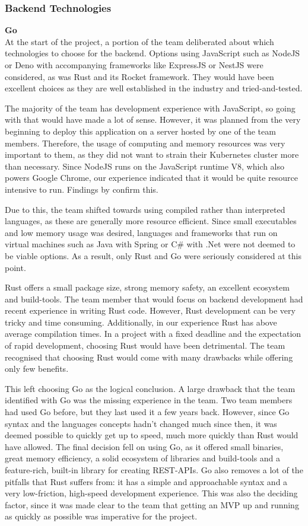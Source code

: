 \subsubsection{Backend Technologies}
\textbf{Go}\\
At the start of the project, a portion of the team deliberated about which
technologies to choose for the backend. Options using JavaScript such as NodeJS
or Deno with accompanying frameworks like ExpressJS or NestJS were considered,
as was Rust and its Rocket framework. They would have been excellent choices as
they are well established in the industry and tried-and-tested.

The majority of the team has development experience with JavaScript, so going
with that would have made a lot of sense. However, it was planned from the very
beginning to deploy this application on a server hosted by one of the team
members. Therefore, the usage of computing and memory resources was very
important to them, as they did not want to strain their Kubernetes cluster more
than necessary. Since NodeJS runs on the JavaScript runtime V8, which also
powers Google Chrome, our experience indicated that it would be quite resource
intensive to run. Findings by \textcite{Tanadechopon2023} confirm this.

Due to this, the team shifted towards using compiled rather than interpreted
languages, as these are generally more resource efficient. Since small
executables and low memory usage was desired, languages and frameworks that run
on virtual machines such as Java with Spring or C\# with .Net were not deemed to
be viable options. As a result, only Rust and Go were seriously considered at
this point.

Rust offers a small package size, strong memory safety, an excellent
ecosystem and build-tools. The team member that would focus on backend
development had recent experience in writing Rust code. However, Rust
development can be very tricky and time consuming. Additionally, in our
experience Rust has above average compilation times. In a project with a fixed
deadline and the expectation of rapid development, choosing Rust would have been
detrimental. The team recognised that choosing Rust would come with many
drawbacks while offering only few benefits.

This left choosing Go as the logical conclusion. A large drawback that the team
identified with Go was the missing experience in the team. Two team members had
used Go before, but they last used it a few years back. However, since Go syntax
and the languages concepts hadn't changed much since then, it was deemed
possible to quickly get up to speed, much more quickly than Rust would have
allowed. The final decision fell on using Go, as it offered small binaries,
great memory efficiency, a solid ecosystem of libraries and build-tools and a
feature-rich, built-in library for creating REST-APIs. Go also removes a lot of
the pitfalls that Rust suffers from: it has a simple and approachable syntax and
a very low-friction, high-speed development experience. This was also the
deciding factor, since it was made clear to the team that getting an MVP up and
running as quickly as possible was imperative for the project.


